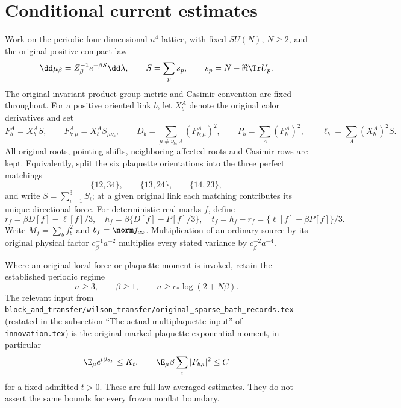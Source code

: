 \section{Conditional current estimates}
\label{rt:target}

Work on the periodic four-dimensional \(n^4\) lattice, with fixed \(SU(N)\), \(N\ge2\), and the original positive compact law
\begin{equation}
 \dd\mu_\beta=Z_\beta^{-1}e^{-\beta S}\dd\lambda,\qquad
 S=\sum_p s_p,\qquad s_p=N-\Re\Tr U_p .
 \label{rt:law}
\end{equation}
The original invariant product-group metric and Casimir convention are fixed throughout. For a positive oriented link \(b\), let \(X_b^A\) denote the original color derivatives and set
\[
 F_b^A=X_b^AS,\qquad
 F_{b;\mu}^A=X_b^AS_{\mu\nu_b},\qquad
 D_b=\sum_{\mu\ne\nu_b,A}(F_{b;\mu}^A)^2,\qquad
 P_b=\sum_A(F_b^A)^2,\qquad
 \ell_b=\sum_A(X_b^A)^2S.
\]
All original roots, pointing shifts, neighboring affected roots and Casimir rows are kept. Equivalently, split the six plaquette orientations into the three perfect matchings
\[
 \{12,34\},\qquad \{13,24\},\qquad \{14,23\},
\]
and write \(S=\sum_{i=1}^3S_i\); at a given original link each matching contributes its unique directional force. For deterministic real marks \(f\), define
\begin{equation}
 r_f=\beta D[f]-\ell[f]/3,\quad
 h_f=\beta\{D[f]-P[f]/3\},\quad
 t_f=h_f-r_f=\{\ell[f]-\beta P[f]\}/3 .
 \label{rt:source}
\end{equation}
Write \(M_f=\sum_bf_b^2\) and \(b_f=\norm f_\infty\). Multiplication of an ordinary source by its original physical factor \(c_\beta^{-1}a^{-2}\) multiplies every stated variance by \(c_\beta^{-2}a^{-4}\).

Where an original local force or plaquette moment is invoked, retain the established periodic regime
\begin{equation}
 n\ge3,\qquad \beta\ge1,\qquad
 n\ge c_*\log(2+N\beta).
 \label{rt:momentregime}
\end{equation}
The relevant input from \texttt{block\_and\_transfer/wilson\_transfer/original\_sparse\_bath\_records.tex} (restated in the subsection ``The actual multiplaquette input'' of \texttt{innovation.tex}) is the original marked-plaquette exponential moment, in particular
\[
 \E_\mu e^{t\beta s_p}\le K_t,\qquad
 \E_\mu\beta\sum_i|F_{b,i}|^2\le C
\]
for a fixed admitted \(t>0\). These are full-law averaged estimates. They do not assert the same bounds for every frozen nonflat boundary.

